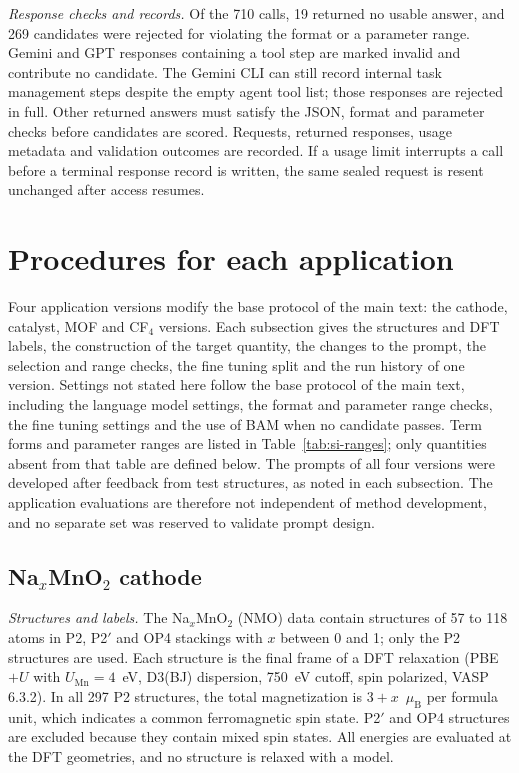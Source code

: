\textit{Response checks and records.} \ifbulk Of the 710 calls, 19 returned no usable answer, and 269 candidates were rejected for violating the format or a parameter range.\fi{} Gemini and GPT responses containing a tool step are marked invalid and contribute no candidate. The Gemini CLI can still record internal task management steps despite the empty agent tool list; those responses are rejected in full. Other returned answers must satisfy the JSON, format and parameter checks before candidates are scored. Requests, returned responses, usage metadata and validation outcomes are recorded. If a usage limit interrupts a call before a terminal response record is written, the same sealed request is resent unchanged after access resumes.

\clearpage
\section{Procedures for each application}
\label{si:app-protocols}

Four application versions modify the base protocol of the main text: the cathode, catalyst, MOF and CF$_4$ versions. Each subsection gives the structures and DFT labels, the construction of the target quantity, the changes to the prompt, the selection and range checks, the fine tuning split and the run history of one version. Settings not stated here follow the base protocol of the main text, including the language model settings, the format and parameter range checks, the fine tuning settings and the use of BAM when no candidate passes. Term forms and parameter ranges are listed in Table~\ref{tab:si-ranges}; only quantities absent from that table are defined below. The prompts of all four versions were developed after feedback from test structures, as noted in each subsection. The application evaluations are therefore not independent of method development, and no separate set was reserved to validate prompt design.

\subsection{Na$_x$MnO$_2$ cathode}
\label{si:app-cathode}

\textit{Structures and labels.} The Na$_x$MnO$_2$ (NMO) data contain structures of 57 to 118 atoms in P2, P2$'$ and OP4 stackings with $x$ between 0 and 1; only the P2 structures are used. Each structure is the final frame of a DFT relaxation (PBE$+U$ with $U_{\mathrm{Mn}}=4$~eV, D3(BJ) dispersion, 750~eV cutoff, spin polarized, VASP 6.3.2). In all 297 P2 structures, the total magnetization is $3+x$~$\mu_\mathrm{B}$ per formula unit, which indicates a common ferromagnetic spin state. P2$'$ and OP4 structures are excluded because they contain mixed spin states. All energies are evaluated at the DFT geometries, and no structure is relaxed with a model.

